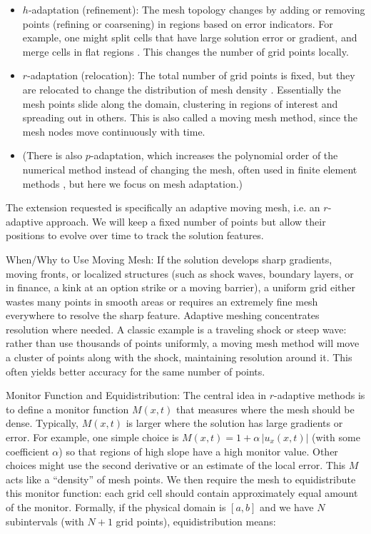 \documentclass{adonis}
\begin{document}
\begin{itemize}
    \item $h$-adaptation (refinement): The mesh topology changes by adding or removing points (refining or coarsening) in regions based on error indicators. For example, one might split cells that have large solution error or gradient, and merge cells in flat regions . This changes the number of grid points locally. 
    \item $r$-adaptation (relocation): The total number of grid points is fixed, but they are relocated to change the distribution of mesh density . Essentially the mesh points slide along the domain, clustering in regions of interest and spreading out in others. This is also called a moving mesh method, since the mesh nodes move continuously with time.
    \item (There is also $p$-adaptation, which increases the polynomial order of the numerical method instead of changing the mesh, often used in finite element methods , but here we focus on mesh adaptation.)
\end{itemize}

The extension requested is specifically an adaptive moving mesh, i.e. an $r$-adaptive approach. We will keep a fixed number of points but allow their positions to evolve over time to track the solution features.

When/Why to Use Moving Mesh: If the solution develops sharp gradients, moving fronts, or localized structures (such as shock waves, boundary layers, or in finance, a kink at an option strike or a moving barrier), a uniform grid either wastes many points in smooth areas or requires an extremely fine mesh everywhere to resolve the sharp feature. Adaptive meshing concentrates resolution where needed. A classic example is a traveling shock or steep wave: rather than use thousands of points uniformly, a moving mesh method will move a cluster of points along with the shock, maintaining resolution around it. This often yields better accuracy for the same number of points.

Monitor Function and Equidistribution: The central idea in $r$-adaptive methods is to define a monitor function $M(x,t)$ that measures where the mesh should be dense. Typically, $M(x,t)$ is larger where the solution has large gradients or error. For example, one simple choice is $M(x,t) = 1 + \alpha\, |u_x(x,t)|$ (with some coefficient $\alpha$) so that regions of high slope have a high monitor value. Other choices might use the second derivative or an estimate of the local error. This $M$ acts like a “density” of mesh points. We then require the mesh to equidistribute this monitor function: each grid cell should contain approximately equal amount of the monitor. Formally, if the physical domain is $ [a,b]$ and we have $N$ subintervals (with $N+1$ grid points), equidistribution means: 
\end{document}
